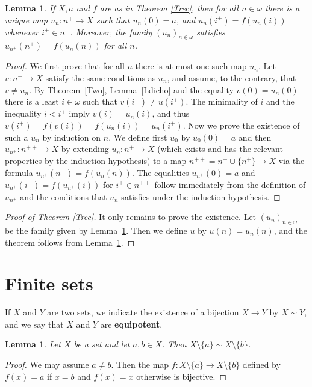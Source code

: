 \documentclass[12pt,letterpaper]{article}
\newtheorem{lem}[thm]{Lemma} %
\begin{document}
\begin{lem}\label{Lrec} 
If \(X,a\) and \(f\) are as in Theorem \ref{Trec}, then for all \(n\in\omega\) there is a unique map \(u_n:n^+\to X\) such that \(u_n(0)=a\), and \(u_n(i^+)=f(u_n(i))\) whenever \(i^+\in n^+\). Moreover, the family \((u_n)_{n\in\omega}\) satisfies \(u_{n^+}(n^+)=f(u_n(n))\) for all \(n\). 
\end{lem} 
\begin{proof} 
We first prove that for all \(n\) there is at most one such map \(u_n\). Let \(v:n^+\to X\) satisfy the same conditions as \(u_n\), and assume, to the contrary, that \(v\ne u_n\). By Theorem~\ref{Two}, Lemma~\ref{Ldicho} and the equality \(v(0)=u_n(0)\) there is a least \(i\in\omega\) such that \(v(i^+)\ne u(i^+)\). The minimality of \(i\) and the inequality \(i<i^+\) imply \(v(i)=u_n(i)\), and thus \(v(i^+)=f(v(i))=f(u_n(i))=u_n(i^+)\). Now we prove the existence of such a \(u_n\) by induction on \(n\). We define first \(u_0\) by \(u_0(0)=a\) and then \(u_{n^+}:n^{++}\to X\) by extending \(u_n:n^+\to X\) (which exists and has the relevant properties by the induction hypothesis) to a map \(n^{++}=n^+\cup\{n^+\}\to X\) via the formula \(u_{n^+}(n^+)=f(u_n(n))\). The equalities \(u_{n^+}(0)=a\) and \(u_{n^+}(i^+)=f(u_{n^+}(i))\) for \(i^+\in n^{++}\) follow immediately from the definition of \(u_{n^+}\) and the conditions that \(u_n\) satisfies under the induction hypothesis. 
\end{proof} 

\begin{proof}[Proof of Theorem \ref{Trec}] 
It only remains to prove the existence. Let \((u_n)_{n\in\omega}\) be the family given by Lemma~\ref{Lrec}. Then we define \(u\) by \(u(n)=u_n(n)\), and the theorem follows from Lemma~\ref{Lrec}. 
\end{proof} 

\section{Finite sets} %

If \(X\) and \(Y\) are two sets, we indicate the existence of a bijection \(X\to Y\) by \(X\sim Y\), and we say that \(X\) and \(Y\) are \textbf{equipotent}. 

\begin{lem}\label{LabX} 
Let \(X\) be a set and let \(a,b\in X\). Then \(X\setminus\{a\}\sim X\setminus\{b\}\).
\end{lem} 
\begin{proof} 
We may assume \(a\ne b\). Then the map \(f:X\setminus\{a\}\to X\setminus\{b\}\) defined by \(f(x)=a\) if \(x=b\) and \(f(x)=x\) otherwise is bijective. 
\end{proof} 
\end{document}
